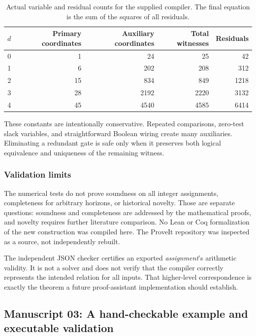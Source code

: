 \documentclass[11pt,a4paper]{article}
\theoremstyle{definition}
\theoremstyle{remark}
\begin{document}
\begin{table}[H]
\centering
\begin{tabular}{rrrrr}
\toprule
$d$ & Primary coordinates & Auxiliary coordinates & Total witnesses & Residuals\\
\midrule
0 & 1 & 24 & 25 & 42\\
1 & 6 & 202 & 208 & 312\\
2 & 15 & 834 & 849 & 1218\\
3 & 28 & 2192 & 2220 & 3132\\
4 & 45 & 4540 & 4585 & 6414\\
\bottomrule
\end{tabular}
\caption{Actual variable and residual counts for the supplied compiler.
The final equation is the sum of the squares of all residuals.}
\label{cdc:pt:tab:compiler}
\end{table}

These constants are intentionally conservative. Repeated comparisons,
zero-test slack variables, and straightforward Boolean wiring create many
auxiliaries. Eliminating a redundant gate is safe only when it preserves
both logical equivalence and uniqueness of the remaining witness.

\subsubsection{Validation limits}
The numerical tests do not prove soundness on all integer assignments,
completeness for arbitrary horizons, or historical novelty. Those are
separate questions: soundness and completeness are addressed by the
mathematical proofs, and novelty requires further literature comparison.
No Lean or Coq formalization of the new construction was compiled here.
The ProveIt repository was inspected as a source, not independently rebuilt.

The independent JSON checker certifies an exported \emph{assignment}'s
arithmetic validity. It is not a solver and does not verify that the
compiler correctly represents the intended relation for all inputs.
That higher-level correspondence is exactly the theorem a future
proof-assistant implementation should establish.


\subsection{Manuscript 03: A hand-checkable example and executable validation}\label{cdc:mem:sec:validation}
\end{document}
